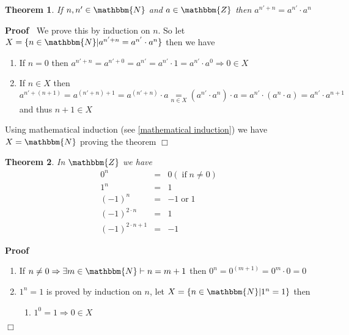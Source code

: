 \documentclass{book}
\newcommand{\equallim}{\mathop{=}\limits}
\newcommand{\tmop}[1]{\ensuremath{\operatorname{#1}}}
\newcommand{\upl}{+}
\newenvironment{proof}{\noindent\textbf{Proof\ }}{\hspace*{\fill}$\Box$\medskip}
\newtheorem{theorem}{Theorem}
\begin{document}
{{\begin{theorem}
  If $n, n' \in \mathbbm{N}$ and $a \in \mathbbm{Z}$ then $a^{n' \upl n} =
  a^{n'} \cdot a^n$
\end{theorem}

\begin{proof}
  We prove this by induction on $n$. So let $X = \{ n \in \mathbbm{N}|a^{n'
  \upl n} = a^{n'} \cdot a^n \}$ then we have
  \begin{enumerate}
    \item If $n = 0$ then $a^{n' \upl n} = a^{n' \upl 0} = a^{n'} = a^{n'}
    \cdot 1 = a^{n'} \cdot a^0 \Rightarrow 0 \in X$
    
    \item If $n \in X$ then $a^{n' \upl (n \upl 1)} = a^{(n' \upl n) \upl 1} =
    a^{(n' \upl n)} \cdot a \equallim_{n \in X} (a^{n'} \cdot a^n) \cdot a =
    a^{n'} \cdot (a^n \cdot a) = a^{n'} \cdot a^{n \upl 1}$ and thus $n \upl 1
    \in X$
  \end{enumerate}
  Using mathematical induction (see \ref{mathematical induction}) we have $X
  =\mathbbm{N}$ proving the theorem
\end{proof}

\begin{theorem}
  \label{power in the whole numbers}In $\mathbbm{Z}$ we have
  \begin{eqnarray*}
    0^n & = & 0 (\tmop{if} n \neq 0)\\
    1^n & = & 1\\
    (- 1)^n & = & - 1 \tmop{or} 1\\
    (- 1)^{2 \cdot n} & = & 1\\
    (- 1)^{2 \cdot n \upl 1} & = & - 1
  \end{eqnarray*}
\end{theorem}

\begin{proof}
  
  \begin{enumerate}
    \item If $n \neq 0 \Rightarrow \exists m \in \mathbbm{N} \vdash n = m \upl
    1$ then $0^n = 0^{(m \upl 1)} = 0^m \cdot 0 = 0$
    
    \item $1^n = 1$ is proved by induction on $n$, let $X = \{ n \in
    \mathbbm{N}|1^n = 1 \}$ then
    \begin{enumerate}
      \item $1^0 = 1 \Rightarrow 0 \in X$
      

\end{enumerate}
\end{enumerate}
\end{proof}}}
\end{document}
